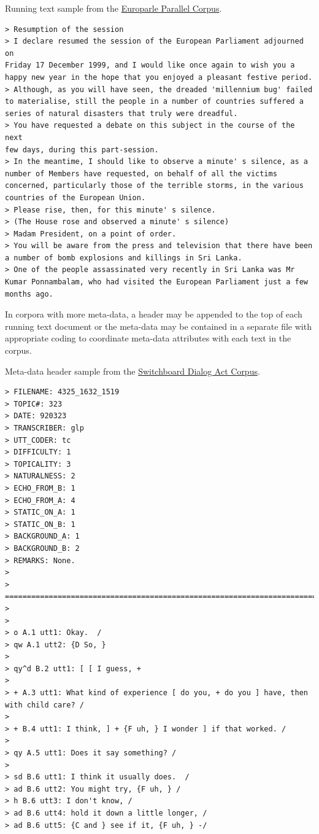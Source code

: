 \documentclass[
  letterpaper,
]{latex/krantz}
\begin{document}
Running text sample from the
\href{https://www.statmt.org/europarl/}{Europarle Parallel Corpus}.

\begin{verbatim}
> Resumption of the session
> I declare resumed the session of the European Parliament adjourned on
Friday 17 December 1999, and I would like once again to wish you a
happy new year in the hope that you enjoyed a pleasant festive period.
> Although, as you will have seen, the dreaded 'millennium bug' failed
to materialise, still the people in a number of countries suffered a
series of natural disasters that truly were dreadful.
> You have requested a debate on this subject in the course of the next
few days, during this part-session.
> In the meantime, I should like to observe a minute' s silence, as a
number of Members have requested, on behalf of all the victims
concerned, particularly those of the terrible storms, in the various
countries of the European Union.
> Please rise, then, for this minute' s silence.
> (The House rose and observed a minute' s silence)
> Madam President, on a point of order.
> You will be aware from the press and television that there have been
a number of bomb explosions and killings in Sri Lanka.
> One of the people assassinated very recently in Sri Lanka was Mr
Kumar Ponnambalam, who had visited the European Parliament just a few
months ago.
\end{verbatim}

In corpora with more meta-data, a header may be appended to the top of
each running text document or the meta-data may be contained in a
separate file with appropriate coding to coordinate meta-data attributes
with each text in the corpus.

Meta-data header sample from the \href{}{Switchboard Dialog Act Corpus}.

\begin{verbatim}
> FILENAME: 4325_1632_1519
> TOPIC#: 323
> DATE: 920323
> TRANSCRIBER: glp
> UTT_CODER: tc
> DIFFICULTY: 1
> TOPICALITY: 3
> NATURALNESS: 2
> ECHO_FROM_B: 1
> ECHO_FROM_A: 4
> STATIC_ON_A: 1
> STATIC_ON_B: 1
> BACKGROUND_A: 1
> BACKGROUND_B: 2
> REMARKS: None.
>
>
=========================================================================
>
>
> o A.1 utt1: Okay.  /
> qw A.1 utt2: {D So, }
>
> qy^d B.2 utt1: [ [ I guess, +
>
> + A.3 utt1: What kind of experience [ do you, + do you ] have, then
with child care? /
>
> + B.4 utt1: I think, ] + {F uh, } I wonder ] if that worked. /
>
> qy A.5 utt1: Does it say something? /
>
> sd B.6 utt1: I think it usually does.  /
> ad B.6 utt2: You might try, {F uh, } /
> h B.6 utt3: I don't know, /
> ad B.6 utt4: hold it down a little longer, /
> ad B.6 utt5: {C and } see if it, {F uh, } -/
\end{verbatim}
\end{document}
